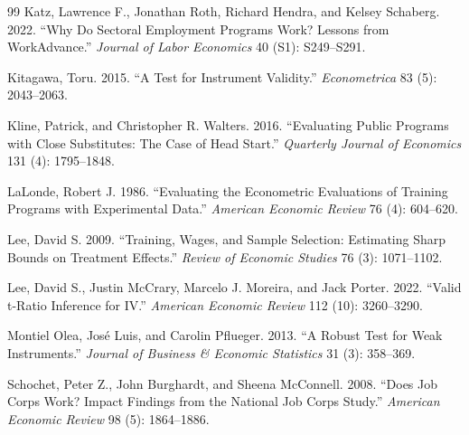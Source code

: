 \documentclass[12pt]{article}
\begin{document}
\begin{thebibliography}{99}
Katz, Lawrence F., Jonathan Roth, Richard Hendra, and Kelsey Schaberg. 2022. ``Why Do Sectoral Employment Programs Work? Lessons from WorkAdvance.'' \textit{Journal of Labor Economics} 40 (S1): S249--S291.

Kitagawa, Toru. 2015. ``A Test for Instrument Validity.'' \textit{Econometrica} 83 (5): 2043--2063.

Kline, Patrick, and Christopher R. Walters. 2016. ``Evaluating Public Programs with Close Substitutes: The Case of Head Start.'' \textit{Quarterly Journal of Economics} 131 (4): 1795--1848.

LaLonde, Robert J. 1986. ``Evaluating the Econometric Evaluations of Training Programs with Experimental Data.'' \textit{American Economic Review} 76 (4): 604--620.

Lee, David S. 2009. ``Training, Wages, and Sample Selection: Estimating Sharp Bounds on Treatment Effects.'' \textit{Review of Economic Studies} 76 (3): 1071--1102.

Lee, David S., Justin McCrary, Marcelo J. Moreira, and Jack Porter. 2022. ``Valid t-Ratio Inference for IV.'' \textit{American Economic Review} 112 (10): 3260--3290.

Montiel Olea, Jos\'e Luis, and Carolin Pflueger. 2013. ``A Robust Test for Weak Instruments.'' \textit{Journal of Business \& Economic Statistics} 31 (3): 358--369.

Schochet, Peter Z., John Burghardt, and Sheena McConnell. 2008. ``Does Job Corps Work? Impact Findings from the National Job Corps Study.'' \textit{American Economic Review} 98 (5): 1864--1886.

\end{thebibliography}
\end{document}
